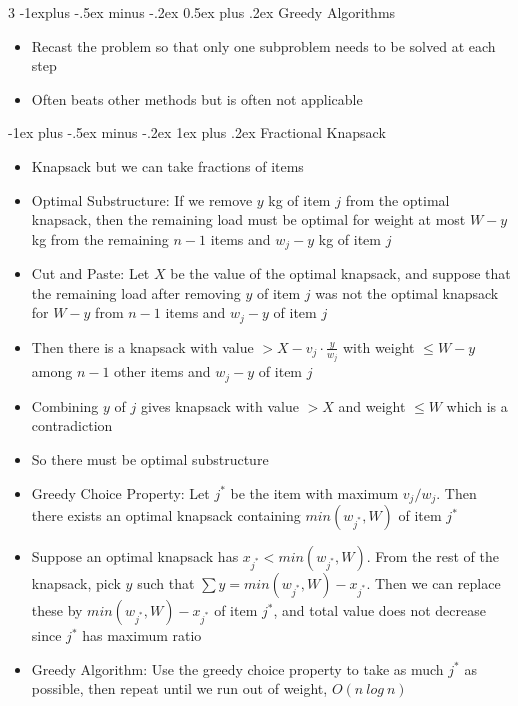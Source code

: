 \documentclass[10pt, landscape]{article}
\makeatletter
\renewcommand{\section}{\@startsection{section}{1}{0mm}%
                                {-1ex plus -.5ex minus -.2ex}%
                                {0.5ex plus .2ex}%
                                {\normalfont\large\bfseries}}
\renewcommand{\section}{\@startsection{section}{2}{0mm}%
                                {-1explus -.5ex minus -.2ex}%
                                {0.5ex plus .2ex}%
                                {\normalfont\normalsize\bfseries}}
\renewcommand{\subsection}{\@startsection{subsection}{3}{0mm}%
                                {-1ex plus -.5ex minus -.2ex}%
                                {1ex plus .2ex}%
                                {\normalfont\small\bfseries}}%
\makeatother
\begin{document}
\begin{multicols*}{3}
\section{Greedy Algorithms}
\begin{itemize}
    \item Recast the problem so that only one subproblem needs to be solved at each step
    \item Often beats other methods but is often not applicable
\end{itemize}

\subsection{Fractional Knapsack}
\begin{itemize}
    \item Knapsack but we can take fractions of items
    \item Optimal Substructure: If we remove $y$ kg of item $j$ from the optimal knapsack, then the remaining load must be optimal for weight at most $W-y$ kg from the remaining $n-1$ items and $w_j-y$ kg of item $j$
    \item Cut and Paste: Let $X$ be the value of the optimal knapsack, and suppose that the remaining load after removing $y$ of item $j$ was not the optimal knapsack for $W-y$ from $n-1$ items and $w_j-y$ of item $j$
    \item Then there is a knapsack with value $> X-v_j\cdot \frac{y}{w_j}$ with weight $\leq W-y$ among $n-1$ other items and $w_j-y$ of item $j$
    \item Combining $y$ of $j$ gives knapsack with value $>X$ and weight $\leq W$ which is a contradiction
    \item So there must be optimal substructure
    \item Greedy Choice Property: Let $j^*$ be the item with maximum $v_j/w_j$. Then there exists an optimal knapsack containing $min(w_{j^*}, W)$ of item $j^*$
    \item Suppose an optimal knapsack has $x_{j^*} < min(w_{j^*}, W)$. From the rest of the knapsack, pick $y$ such that $\sum y=min(w_{j^*}, W)-x_{j^*}$. Then we can replace these by $min(w_{j^*}, W)-x_{j^*}$ of item $j^*$, and total value does not decrease since $j^*$ has maximum ratio
    \item Greedy Algorithm: Use the greedy choice property to take as much $j^*$ as possible, then repeat until we run out of weight, $O(n\ log\ n)$
\end{itemize}


\end{multicols*}
\end{document}
